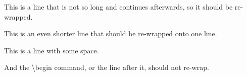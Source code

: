 \documentclass{article}
\begin{document}
This is a line that is not so long and continues afterwards, so it
should be re-wrapped.

This is an even shorter line that should be re-wrapped onto one line.

This is a line with some space.
\begin{definition}
  And the \textbackslash{}begin command, or the line after it, should
  not re-wrap.
\end{definition}
\end{document}
